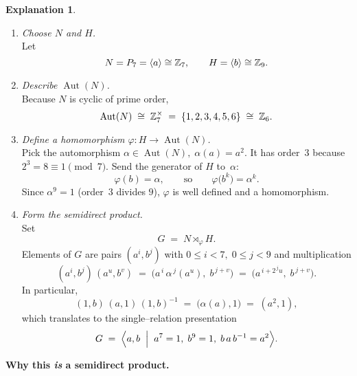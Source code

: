 \documentclass[12pt]{article}
\DeclareMathOperator{\Aut}{Aut}
\theoremstyle{definition} %
\newtheorem{explanation}{Explanation}
\theoremstyle{plain} %
\begin{document}
\begin{explanation}
    \begin{enumerate}[]
       \item \emph{Choose $N$ and $H$.}\\
             Let 
             \[
                N=P_{7}=\langle a\rangle\cong\Bbb Z_{7},
                \qquad
                H=\langle b\rangle\cong\Bbb Z_{9}.
             \]
       \item \emph{Describe $\Aut(N)$.}\\
             Because $N$ is cyclic of prime order, 
             \[
                \Aut(N)\;\cong\;\Bbb Z_{7}^{\times}
                          \;=\;\{1,2,3,4,5,6\}\;\cong\;\Bbb Z_{6}.
             \]
       \item \emph{Define a homomorphism $\varphi:H\to\Aut(N)$.}\\
             Pick the automorphism
             \(
                 \alpha\in\Aut(N),\; \alpha(a)=a^{2}.
             \)
             It has order~$3$ because $2^{3}=8\equiv1\pmod{7}$.  
             Send the generator of $H$ to~$\alpha$:
             \[
                \varphi(b)=\alpha,
                \qquad\text{so}\qquad
                \varphi\bigl(b^{k}\bigr)=\alpha^{k}.
             \]
             Since $\alpha^{9}=1$ (order~$3$ divides $9$), $\varphi$ is well
             defined and a homomorphism.
       \item \emph{Form the semidirect product.}\\
             Set 
             \[
                G \;=\; N\rtimes_{\!\varphi} H.
             \]
             Elements of $G$ are pairs $(a^{i},b^{j})$
             with $0\le i<7,\;0\le j<9$ and multiplication
             \[
                (a^{i},b^{j})\,(a^{u},b^{v})
                  \;=\;
                \bigl(a^{\,i}\,\alpha^{\,j}(a^{u}),\;b^{\,j+v}\bigr)
                  \;=\;
                \bigl(a^{\,i+2^{\,j}u},\;b^{\,j+v}\bigr).
             \]
             In particular,
             \[
                (1,b)\,(a,1)\,(1,b)^{-1}
                  \;=\;
                \bigl(\alpha(a),1\bigr)
                  \;=\;
                (a^{2},1),
             \]
             which translates to the single–relation presentation
             \[
               G\;=\;
               \Bigl\langle
                      a,b
                      \;\Bigm|\;
                      a^{7}=1,\;b^{9}=1,\;
                      b\,a\,b^{-1}=a^{2}
               \Bigr\rangle.
             \]
    \end{enumerate}
    
    \bigskip
    \textbf{Why this \emph{is} a semidirect product.}
    

\end{explanation}
\end{document}
